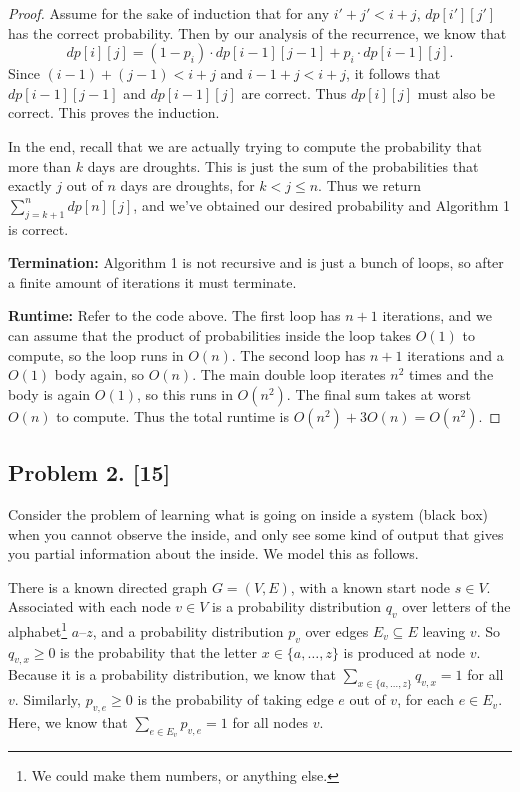 \documentclass[10pt]{article}
\begin{document}
\begin{proof}
  Assume for the sake of induction that for any \(i' + j' < i + j\), \(dp[i'][j']\) has the correct probability. Then by our analysis of the recurrence, we know that 
  \[dp[i][j] = (1 - p_i) \cdot dp[i - 1][j - 1] + p_i \cdot dp[i - 1][j].\] 
  Since \((i - 1) + (j - 1) < i + j\) and \(i - 1 + j < i + j\), it follows that \(dp[i - 1][j - 1]\) and \(dp[i - 1][j]\) are correct. Thus \(dp[i][j]\) must also be correct. This proves the induction.

  In the end, recall that we are actually trying to compute the probability that more than \(k\) days are droughts. This is just the sum of the probabilities that exactly \(j\) out of \(n\) days are droughts, for \(k < j \leq n\). Thus we return \(\sum_{j = k + 1}^n dp[n][j]\), and we've obtained our desired probability and Algorithm 1 is correct.

  \textbf{Termination:} Algorithm 1 is not recursive and is just a bunch of loops, so after a finite amount of iterations it must terminate.

  \textbf{Runtime:} Refer to the code above. The first loop has \(n + 1\) iterations, and we can assume that the product of probabilities inside the loop takes \(O(1)\) to compute, so the loop runs in \(O(n)\). The second loop has \(n + 1\) iterations and a \(O(1)\) body again, so \(O(n)\). The main double loop iterates \(n^2\) times and the body is again \(O(1)\), so this runs in \(O(n^2)\). The final sum takes at worst \(O(n)\) to compute. Thus the total runtime is \(O(n^2) + 3O(n) = O(n^2)\).
\end{proof}

\subsection*{Problem 2. [15]}
  Consider the problem of learning what is going on inside a system (black box) when you cannot observe the inside, and only see some kind of output that gives you partial information about the inside. We model this as follows.

  There is a known directed graph $G=(V,E)$, with a known start node $s \in V$. Associated with each node $v \in V$ is a probability distribution $q_v$ over letters of the alphabet\footnote{We could make them numbers, or anything else.} $a$--$z$, and a probability distribution $p_v$ over edges $E_v \subseteq E$ leaving $v$. So $q_{v,x} \geq 0$ is the probability that the letter $x \in \{a, \ldots, z\}$ is produced at node $v$. Because it is a probability distribution, we know that $\sum_{x \in \{a, \ldots, z\}} q_{v, x} = 1$ for all $v$.
  Similarly, $p_{v,e} \geq 0$ is the probability of taking edge $e$ out of $v$, for each $e \in E_v$. Here, we know that $\sum_{e \in E_v} p_{v,e} = 1$ for all nodes $v$.
\end{document}
